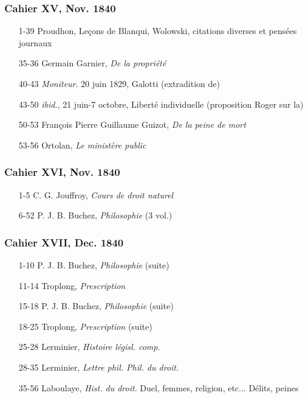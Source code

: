 \subsubsection*{Cahier XV, Nov. 1840}
\begin{enumerate}
    \item[1-39] Proudhon, Leçons de Blanqui, Wolowski, citations diverses et pensées journaux
    \item[35-36] Germain Garnier, \textit{De la propriété}
    \item[40-43] \textit{Moniteur}. 20 juin 1829, Galotti (extradition de)
    \item[43-50] \textit{ibid.}, 21 juin-7 octobre, Liberté individuelle (proposition Roger sur la)	\item[50-53] François Pierre Guillaume Guizot, \textit{De la peine de mort}
    \item[53-56] Ortolan, \textit{Le ministère public}
\end{enumerate}
\subsubsection*{Cahier XVI, Nov. 1840}
\begin{enumerate}
    \item[1-5] C. G. Jouffroy, \textit{Cours de droit naturel}
    \item[6-52] P. J. B. Buchez, \textit{Philosophie} (3 vol.)
\end{enumerate}
\subsubsection*{Cahier XVII, Dec. 1840}
\begin{enumerate}
    \item[1-10] P. J. B. Buchez, \textit{Philosophie} (suite)
    \item[11-14] Troplong, \textit{Prescription}	
    \item[15-18] P. J. B. Buchez, \textit{Philosophie} (suite)
    \item[18-25] Troplong, \textit{Prescription} (suite)
    \item[25-28] Lerminier, \textit{Histoire législ. comp.}
    \item[28-35] Lerminier, \textit{Lettre phil. Phil. du droit.}
    \item[35-56] Laboulaye, \textit{Hist. du droit}. Duel, femmes, religion, etc... Délits, peines
\end{enumerate}

